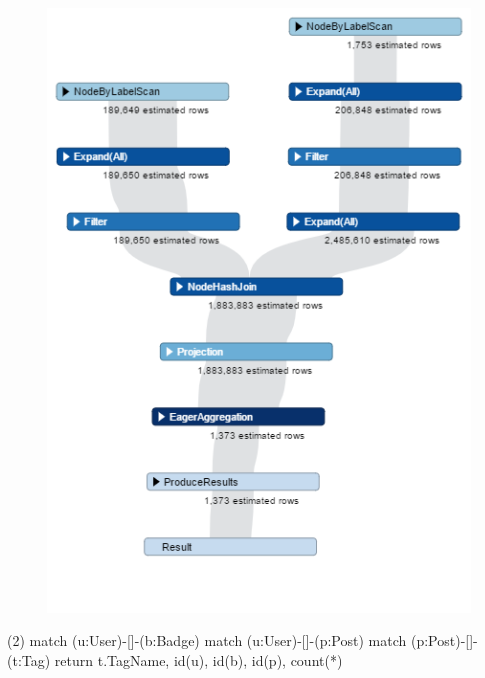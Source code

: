 \begin {figure}[H]
\centering
\includegraphics[scale=0.6]{pic/61.png}
\end{figure}

(2) match (u:User)-[]-(b:Badge)  match (u:User)-[]-(p:Post)  match (p:Post)-[]-(t:Tag)  return  t.TagName, id(u), id(b), id(p), count(*)

